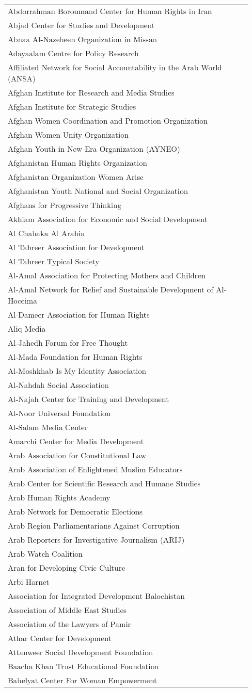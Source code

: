 \begin{longtable}[]{@{}l@{}}
\toprule
\endhead
Abdorrahman Boroumand Center for Human Rights in Iran\tabularnewline
Abjad Center for Studies and Development\tabularnewline
Abnaa Al-Nazeheen Organization in Missan\tabularnewline
Adayaalam Centre for Policy Research\tabularnewline
Affiliated Network for Social Accountability in the Arab World
(ANSA)\tabularnewline
Afghan Institute for Research and Media Studies\tabularnewline
Afghan Institute for Strategic Studies\tabularnewline
Afghan Women Coordination and Promotion Organization\tabularnewline
Afghan Women Unity Organization\tabularnewline
Afghan Youth in New Era Organization (AYNEO)\tabularnewline
Afghanistan Human Rights Organization\tabularnewline
Afghanistan Organization Women Arise\tabularnewline
Afghanistan Youth National and Social Organization\tabularnewline
Afghans for Progressive Thinking\tabularnewline
Akhiam Association for Economic and Social Development\tabularnewline
Al Chabaka Al Arabia\tabularnewline
Al Tahreer Association for Development\tabularnewline
Al Tahreer Typical Society\tabularnewline
Al-Amal Association for Protecting Mothers and Children\tabularnewline
Al-Amal Network for Relief and Sustainable Development of
Al-Hoceima\tabularnewline
Al-Dameer Association for Human Rights\tabularnewline
Aliq Media\tabularnewline
Al-Jahedh Forum for Free Thought\tabularnewline
Al-Mada Foundation for Human Rights\tabularnewline
Al-Moshkhab Is My Identity Association\tabularnewline
Al-Nahdah Social Association\tabularnewline
Al-Najah Center for Training and Development\tabularnewline
Al-Noor Universal Foundation\tabularnewline
Al-Salam Media Center\tabularnewline
Amarchi Center for Media Development\tabularnewline
Arab Association for Constitutional Law\tabularnewline
Arab Association of Enlightened Muslim Educators\tabularnewline
Arab Center for Scientific Research and Humane Studies\tabularnewline
Arab Human Rights Academy\tabularnewline
Arab Network for Democratic Elections\tabularnewline
Arab Region Parliamentarians Against Corruption\tabularnewline
Arab Reporters for Investigative Journalism (ARIJ)\tabularnewline
Arab Watch Coalition\tabularnewline
Aran for Developing Civic Culture\tabularnewline
Arbi Harnet\tabularnewline
Association for Integrated Development Balochistan\tabularnewline
Association of Middle East Studies\tabularnewline
Association of the Lawyers of Pamir\tabularnewline
Athar Center for Development\tabularnewline
Attanweer Social Development Foundation\tabularnewline
Baacha Khan Trust Educational Foundation\tabularnewline
Babelyat Center For Woman Empowerment\tabularnewline

\end{longtable}
